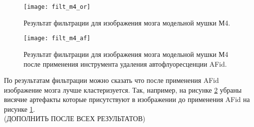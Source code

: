 \begin{figure}[H]
	\centering
	\texttt{[image: filt\_m4\_or]}
	\caption{Результат фильтрации для изображения мозга модельной мушки М4.}
	\label{filt_m4_or}
\end{figure}


\begin{figure}[H]
	\centering
	\texttt{[image: filt\_m4\_af]}
	\caption{Результат фильтрации для изображения мозга модельной мушки М4 после применения инструмента удаления автофлуоресценции AFid.}
	\label{filt_m4_af}
\end{figure}


По результатам фильтрации можно сказать что после применения AFid изображение мозга лучше кластеризуется. Так, например, на рисунке \ref{filt_m4_af} убраны висячие артефакты которые присутствуют в изображении до применения AFid на рисунке \ref{filt_m4_or}.\\

(ДОПОЛНИТЬ ПОСЛЕ ВСЕХ РЕЗУЛЬТАТОВ)




%
